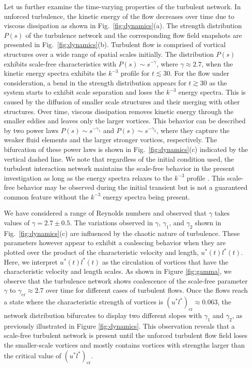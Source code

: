 \documentclass{jfm}
\begin{document}
Let us further examine the time-varying properties of the turbulent network.  In unforced turbulence, the kinetic energy of the flow decreases over time due to viscous dissipation as shown in Fig.~\ref{fig:dynamics}(a).  The strength distribution $P(s)$ of the turbulence network and the corresponding flow field snapshots are presented in Fig.~\ref{fig:dynamics}(b).  Turbulent flow is comprised of vortical structures over a wide range of spatial scales initially.   The distribution $P(s)$ exhibits scale-free characteristics with $P(s) \sim s^{-\gamma}$, where $\gamma \approx 2.7$, when the kinetic energy spectra exhibits the $k^{-3}$ profile for $t \lesssim 30$.  For the flow under consideration, a bend in the strength distribution appears for $t \gtrsim 30$ as the system starts to exhibit scale separation and loses the $k^{-3}$ energy spectra.   This is caused by the diffusion of smaller scale structures and their merging with other structures.  Over time, viscous dissipation removes kinetic energy through the smaller eddies and leaves only the larger vortices.  This behavior can be described by two power laws $P(s) \sim s^{-\gamma_1}$ and $P(s) \sim s^{-\gamma_2}$, where they capture the weaker fluid elements and the larger stronger vortices, respectively.  The bifurcation of these power laws is shown in Fig.~\ref{fig:dynamics}(c) indicated by the vertical dashed line.  We note that regardless of the initial condition used, the turbulent interaction network maintains the scale-free behavior in the present investigation as long as the energy spectra relaxes to the $k^{-3}$ profile \citep{Benzi:PRA90, Brachet:PRL86, Kida:JPSJ85}.  This scale-free behavior may be observed during the initial transient but is not a guaranteed common feature without the $k^{-3}$ energy spectra being present.

We have considered a range of Reynolds numbers and observed that $\gamma$ takes values of $\gamma = 2.7 \pm 0.5$.  The variations observed in $\gamma$, $\gamma_1$, and $\gamma_2$ shown in Fig.~\ref{fig:dynamics}(c) are influenced by the chaotic nature of turbulence.  These parameters however appear to exhibit a coalescing behavior when they are plotted over the product of the characteristic velocity and length, $u^*(t) l^*(t)$.  Here, we interpret $u^*(t) l^*(t)$ as the circulation of vortices that have the characteristic velocity and length scales.  As shown in Figure \ref{fig:gamma}, we observe that the turbulence network shows coalescence of the scale-free parameter $\gamma$ to $\gamma_\text{cr} \approx 2.7$ over time for different cases of turbulent flows.  Once the flows reach a state where the characteristic strength of vortices is $( u^* l^* )_\text{cr} \approx 0.063$, the network distribution bifurcates to display two different slopes with $\gamma_1$ and $\gamma_2$, as previously illustrated in Figure \ref{fig:dynamics}.  This observation reveals that a scale-free turbulent network is present until the unforced turbulent flow field loses the smaller-scale vortices and mostly contains vortices with strengths larger than the critical value of $( u^* l^* )_\text{cr}$. 
\end{document}
